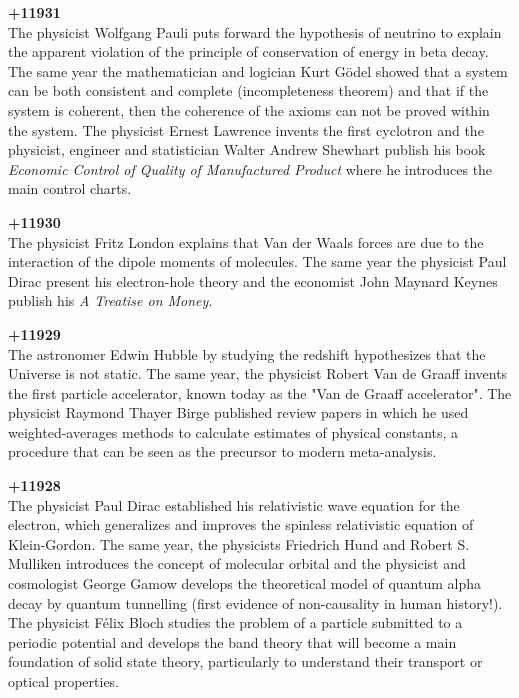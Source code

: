 \textbf{+11931}\\
The physicist Wolfgang Pauli puts forward the hypothesis of neutrino to explain the apparent violation of the principle of conservation of energy in beta decay. The same year the mathematician and logician Kurt Gödel showed that a system can be both consistent and complete (incompleteness theorem) and that if the system is coherent, then the coherence of the axioms can not be proved within the system. The physicist Ernest Lawrence invents the first cyclotron and the physicist, engineer and statistician Walter Andrew Shewhart publish his book \textit{Economic Control of Quality of Manufactured Product} where he introduces the main control charts.

\textbf{+11930}\\
The physicist Fritz London explains that Van der Waals forces are due to the interaction of the dipole moments of molecules. The same year the physicist Paul Dirac present his electron-hole theory and the economist John Maynard Keynes publish his \textit{A Treatise on Money}.

\textbf{+11929}\\
The astronomer Edwin Hubble by studying the redshift hypothesizes that the Universe is not static. The same year, the physicist Robert Van de Graaff invents the first particle accelerator, known today as the "Van de Graaff accelerator". The physicist Raymond Thayer Birge published review papers in which he used weighted-averages methods to calculate estimates of physical constants, a procedure that can be seen as the precursor to modern meta-analysis.

\textbf{+11928}\\
The physicist Paul Dirac established his relativistic wave equation for the electron, which generalizes and improves the spinless relativistic equation of Klein-Gordon. The same year, the physicists Friedrich Hund and Robert S. Mulliken introduces the concept of molecular orbital and the physicist and cosmologist George Gamow develops the theoretical model of quantum alpha decay by quantum tunnelling (first evidence of non-causality in human history!). The physicist Félix Bloch studies the problem of a particle submitted to a periodic potential and develops the band theory that will become a main foundation of solid state theory, particularly to understand their transport or optical properties.


